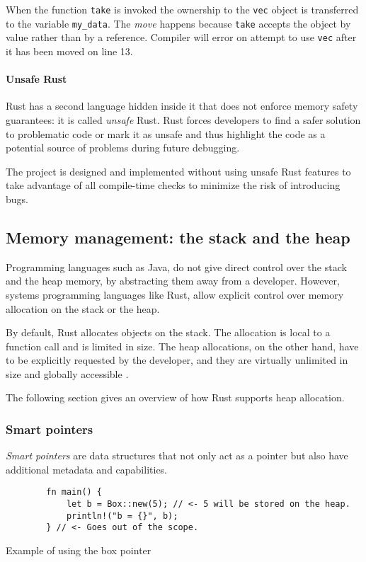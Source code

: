 When the function \texttt{take} is invoked the ownership to the \texttt{vec} object is transferred to the variable \texttt{my_data}. The \emph{move} happens because \texttt{take} accepts the object by value rather than by a reference. Compiler will error on attempt to use \texttt{vec} after it has been moved on line 13.

\paragraph{Unsafe Rust}
Rust has a second language hidden inside it that does not enforce memory safety guarantees: it is called \emph{unsafe} Rust. Rust forces developers to find a safer solution to problematic code or mark it as unsafe and thus highlight the code as a potential source of problems during future debugging.

The \pvecrs{} project is designed and implemented without using unsafe Rust features to take advantage of all compile-time checks to minimize the risk of introducing bugs.

\subsection{Memory management: the stack and the heap}
\label{sec:memory-management-in-rust}

Programming languages such as Java, do not give direct control over the stack and the heap memory, by abstracting them away from a developer. However, systems programming languages like Rust, allow explicit control over memory allocation on the stack or the heap.

By default, Rust allocates objects on the stack. The allocation is local to a function call and is limited in size. The heap allocations, on the other hand, have to be explicitly requested by the developer, and they are virtually unlimited in size and globally accessible \cite{rust-book-2e}.

The following section gives an overview of how Rust supports heap allocation.

\subsubsection*{Smart pointers}
\emph{Smart pointers} are data structures that not only act as a pointer but also have additional metadata and capabilities.

\begin{listing}[!ht]

    \centering
    \begin{verbatim}
        fn main() {
            let b = Box::new(5); // <- 5 will be stored on the heap.
            println!("b = {}", b);
        } // <- Goes out of the scope.
    \end{verbatim}

    \caption{Example of using the box pointer}
    \label{lst:box}
\end{listing}

